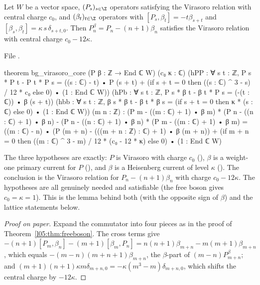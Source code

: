 \begin{theorem}\label{l05:thm:bgcore}
Let $W$ be a vector space, $(P_s)_{s\in\Z}$ operators satisfying the Virasoro relation with central charge $c_0$, and
$(\beta_t)_{t\in\Z}$ operators with $[P_s,\beta_t]=-t\beta_{s+t}$ and $[\beta_s,\beta_t]=\kappa\,s\,\delta_{s+t,0}$. Then
$P^\beta_n=P_n-(n+1)\beta_n$ satisfies the Virasoro relation with central charge $c_0-12\kappa$.
\end{theorem}

\noindent File .
\begin{leancode}
theorem bg_virasoro_core (P β : ℤ → End ℂ W) (c₀ κ : ℂ)
    (hPP : ∀ s t : ℤ, P s * P t - P t * P s
      = ((s : ℂ) - t) • P (s + t)
        + (if s + t = 0 then ((s : ℂ) ^ 3 - s) / 12 * c₀ else 0) • (1 : End ℂ W))
    (hPb : ∀ s t : ℤ, P s * β t - β t * P s = (-(t : ℂ)) • β (s + t))
    (hbb : ∀ s t : ℤ, β s * β t - β t * β s
      = (if s + t = 0 then κ * (s : ℂ) else 0) • (1 : End ℂ W))
    (m n : ℤ) :
    (P m - ((m : ℂ) + 1) • β m) * (P n - ((n : ℂ) + 1) • β n)
      - (P n - ((n : ℂ) + 1) • β n) * (P m - ((m : ℂ) + 1) • β m)
      = ((m : ℂ) - n) • (P (m + n) - (((m + n : ℤ) : ℂ) + 1) • β (m + n))
        + (if m + n = 0 then ((m : ℂ) ^ 3 - m) / 12 * (c₀ - 12 * κ) else 0) • (1 : End ℂ W)
\end{leancode}

\begin{dictionary}
The three hypotheses are exactly: $P$ is Virasoro with charge $c_0$ (), $\beta$ is a weight-one primary current
for $P$ (), and $\beta$ is a Heisenberg current of level $\kappa$ (). The conclusion is the
Virasoro relation for $P_n-(n+1)\beta_n$ with charge $c_0-12\kappa$. The hypotheses are all genuinely needed and
satisfiable (the free boson gives $c_0=\kappa=1$). This is the lemma behind both  (with the opposite
sign of $\beta$) and the lattice statements below.
\end{dictionary}

\begin{proof}[Proof on paper]
Expand the commutator into four pieces as in the proof of Theorem~\ref{l05:thm:freeboson}. The cross terms give
$-(n+1)[P_m,\beta_n]-(m+1)[\beta_m,P_n]=n(n+1)\beta_{m+n}-m(m+1)\beta_{m+n}$, which equals $-(m-n)(m+n+1)\beta_{m+n}$, the $\beta$-part of
$(m-n)P^\beta_{m+n}$; and $(m+1)(n+1)\kappa m\delta_{m+n,0}=-\kappa(m^3-m)\delta_{m+n,0}$, which shifts the central
charge by $-12\kappa$.
\end{proof}

